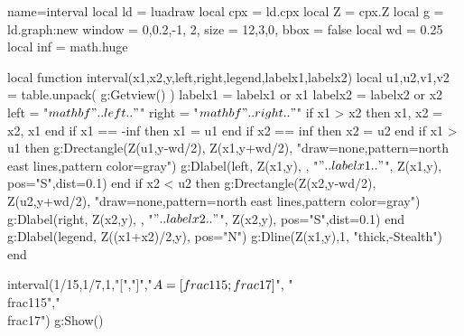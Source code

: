 \documentclass[border=5mm]{standalone}
\begin{document}
\begin{luadraw}{name=interval}
local ld = luadraw
local cpx = ld.cpx
local Z = cpx.Z
local g = ld.graph:new{ window = {0,0.2,-1, 2}, size = {12,3,0}, bbox = false }
local wd = 0.25
local inf = math.huge

local function interval(x1,x2,y,left,right,legend,labelx1,labelx2)
    local u1,u2,v1,v2 = table.unpack( g:Getview() )
    labelx1 = labelx1 or x1
    labelx2 = labelx2 or x2
    left = "$\\mathbf{"..left.."}$"
    right = "$\\mathbf{"..right.."}$"
    if x1 > x2 then x1, x2 = x2, x1 end
    if x1 == -inf then x1 = u1 end
    if x2 == inf then x2 = u2 end
    if x1 > u1 then
        g:Drectangle(Z(u1,y-wd/2), Z(x1,y+wd/2), "draw=none,pattern=north east lines,pattern color=gray")
        g:Dlabel(left, Z(x1,y), {}, "$"..labelx1.."$", Z(x1,y), {pos="S",dist=0.1})
    end
    if x2 < u2 then
        g:Drectangle(Z(x2,y-wd/2), Z(u2,y+wd/2), "draw=none,pattern=north east lines,pattern color=gray")
        g:Dlabel(right, Z(x2,y), {}, "$"..labelx2.."$", Z(x2,y), {pos="S",dist=0.1})
    end
    g:Dlabel(legend, Z((x1+x2)/2,y), {pos="N"})
    g:Dline({Z(x1,y),1}, "thick,-Stealth")
end

interval(1/15,1/7,1,"[","]","$A=[\\frac{1}{15};\\frac{1}{7}]$", "\\frac1{15}","\\frac17")
g:Show()
\end{luadraw}
\end{document}
